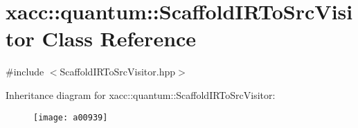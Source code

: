 \hypertarget{a00939}{}\section{xacc\+:\+:quantum\+:\+:Scaffold\+I\+R\+To\+Src\+Visitor Class Reference}
\label{a00939}


{\ttfamily \#include $<$Scaffold\+I\+R\+To\+Src\+Visitor.\+hpp$>$}

Inheritance diagram for xacc\+:\+:quantum\+:\+:Scaffold\+I\+R\+To\+Src\+Visitor\+:\begin{figure}[H]
\begin{center}
\leavevmode
\texttt{[image: a00939]}
\end{center}
\end{figure}
